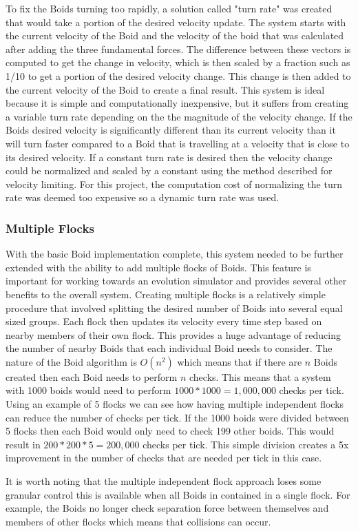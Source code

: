 \documentclass{egpubl}
\begin{document}
To fix the Boids turning too rapidly, a solution called "turn rate" was created that would take a portion of the desired velocity update. The system starts with the current velocity of the Boid and the velocity of the boid that was calculated after adding the three fundamental forces. The difference between these vectors is computed to get the change in velocity, which is then scaled by a fraction such as 1/10 to get a portion of the desired velocity change. This change is then added to the current velocity of the Boid to create a final result. This system is ideal because it is simple and computationally inexpensive, but it suffers from creating a variable turn rate depending on the the magnitude of the velocity change. If the Boids desired velocity is significantly different than its current velocity than it will turn faster compared to a Boid that is travelling at a velocity that is close to its desired velocity. If a constant turn rate is desired then the velocity change could be normalized and scaled by a constant using the method described for velocity limiting. For this project, the computation cost of normalizing the turn rate was deemed too expensive so a dynamic turn rate was used.
\subsubsection{Multiple Flocks}
With the basic Boid implementation complete, this system needed to be further extended with the ability to add multiple flocks of Boids. This feature is important for working towards an evolution simulator and provides several other benefits to the overall system. Creating multiple flocks is a relatively simple procedure that involved splitting the desired number of Boids into several equal sized groups. Each flock then updates its velocity every time step based on nearby members of their own flock. This provides a huge advantage of reducing the number of nearby Boids that each individual Boid needs to consider. The nature of the Boid algorithm is $O(n^2)$ which means that if there are $n$ Boids created then each Boid needs to perform $n$ checks. This means that a system with 1000 boids would need to perform $1000 * 1000 =  1,000,000$ checks per tick. Using an example of 5 flocks we can see how having multiple independent flocks can reduce the number of checks per tick. If the 1000 boids were divided between 5 flocks then each Boid would only need to check 199 other boids. This would result in $200 * 200 * 5 = 200,000$ checks per tick. This simple division creates a 5x improvement in the number of checks that are needed per tick in this case.
\par
It is worth noting that the multiple independent flock approach loses some granular control this is available when all Boids in contained in a single flock. For example, the Boids no longer check separation force between themselves and members of other flocks which means that collisions can occur.
\end{document}
